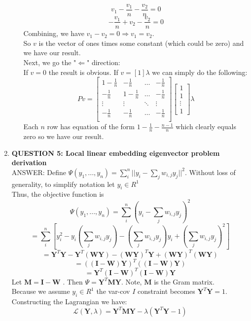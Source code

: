 \documentclass[a4paper, 12pt]{article}
\begin{document}
\begin{enumerate}
\begin{enumerate}
	$$v_1 - \frac{v_1}{n} - \frac{v_2}{n} = 0 $$
	$$- \frac{v_1}{n} + v_2 - \frac{v_2}{n} = 0 $$
	Combining, we have $v_1 - v_2 = 0 \Rightarrow v_1 = v_2$.
	\\So $v$ is the vector of ones times some constant (which could be zero) and we have our result.
	\\ Next, we go the "$\Leftarrow$" direction:
	\\ If $v = 0$ the result is obvious. If $v = [1]\lambda$ we can simply do the following:
	$$Pv =  \left[ \begin{array}{cccc}  1-\frac{1}{n} & -\frac{1}{n} & \dots & -\frac{1}{n} \\
							   -\frac{1}{n} & 1-\frac{1}{n} & \dots & -\frac{1}{n} \\
							    \vdots           & \vdots           & \ddots & \vdots \\
							  -\frac{1}{n}  & -\frac{1}{n}  & \dots & -\frac{1}{n} \\	
								   \end{array}\right]  
		\left[ \begin{array}{c} 1 \\ 1 \\ \vdots \\ 1 \end{array}\right] \lambda 
		$$
	Each $n$ row has equation of the form $1 - \frac{1}{n} - \frac{n-1}{n}$ which clearly equals zero so we have our result.


	\end{enumerate}

	\item \textbf{QUESTION 5: Local linear embedding eigenvector problem derivation } 
	\\
	ANSWER: Define $\Psi (y_1, ... , y_n) = \sum_i^n ||y_i - \sum_j w_{i,j} y_j ||^2 $. Without loss of generality, to simplify notation let $y_i \in R^1$
	\\Thus, the objective function is 
	$$\Psi (y_1, ... , y_n) = \sum_i^n (y_i - \sum_j w_{i,j} y_j )^2 $$
	$$ = \sum_i^n [y_i^2 - y_i(\sum_j w_{i,j} y_j) - (\sum_j w_{i,j} y_j)y_i + (\sum_j w_{i,j} y_j)^2             ] $$
	$$ = \textbf{Y}^T\textbf{Y} - \textbf{Y}^T(\textbf{WY}) - (\textbf{WY})^T\textbf{Y}  +  (\textbf{WY})^T(\textbf{WY})$$
	$$ = ((\textbf{I} - \textbf{W})  \textbf{Y}    )^T   ((\textbf{I} - \textbf{W})  \textbf{Y}    )$$
	$$ = \textbf{Y}^T(\textbf{I} - \textbf{W})^T    (\textbf{I} - \textbf{W})\textbf{Y}   $$
	Let $\textbf{M} = \textbf{I} - \textbf{W} $ . Then $\Psi = \textbf{Y}^T\textbf{M}\textbf{Y}$. Note, $\textbf{M}$ is the Gram matrix.
	\\ Because we assume $y_i \in R^1$ the var-cov $I$ constraint becomes $\textbf{Y}^T\textbf{Y} = 1$. Constructing the Lagrangian we have:
	$$ \mathscr{L}(\textbf{Y}, \lambda) =  \textbf{Y}^T\textbf{M}\textbf{Y}  - \lambda(\textbf{Y}^T\textbf{Y} - 1)$$
	

\end{enumerate}
\end{document}

